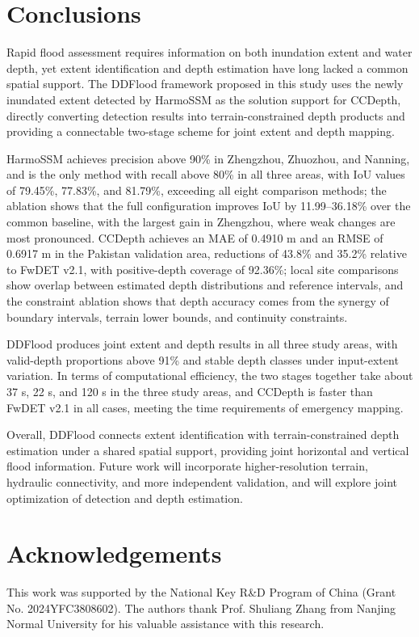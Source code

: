 \documentclass[authoryear,preprint,12pt]{elsarticle}
\begin{document}
\section{Conclusions}

Rapid flood assessment requires information on both inundation extent and water depth, yet extent identification and depth estimation have long lacked a common spatial support. The DDFlood framework proposed in this study uses the newly inundated extent detected by HarmoSSM as the solution support for CCDepth, directly converting detection results into terrain-constrained depth products and providing a connectable two-stage scheme for joint extent and depth mapping.

HarmoSSM achieves precision above 90\% in Zhengzhou, Zhuozhou, and Nanning, and is the only method with recall above 80\% in all three areas, with IoU values of 79.45\%, 77.83\%, and 81.79\%, exceeding all eight comparison methods; the ablation shows that the full configuration improves IoU by 11.99–36.18\% over the common baseline, with the largest gain in Zhengzhou, where weak changes are most pronounced. CCDepth achieves an MAE of 0.4910 m and an RMSE of 0.6917 m in the Pakistan validation area, reductions of 43.8\% and 35.2\% relative to FwDET v2.1, with positive-depth coverage of 92.36\%; local site comparisons show overlap between estimated depth distributions and reference intervals, and the constraint ablation shows that depth accuracy comes from the synergy of boundary intervals, terrain lower bounds, and continuity constraints.

DDFlood produces joint extent and depth results in all three study areas, with valid-depth proportions above 91\% and stable depth classes under input-extent variation. In terms of computational efficiency, the two stages together take about 37 s, 22 s, and 120 s in the three study areas, and CCDepth is faster than FwDET v2.1 in all cases, meeting the time requirements of emergency mapping.

Overall, DDFlood connects extent identification with terrain-constrained depth estimation under a shared spatial support, providing joint horizontal and vertical flood information. Future work will incorporate higher-resolution terrain, hydraulic connectivity, and more independent validation, and will explore joint optimization of detection and depth estimation.

\section*{Acknowledgements}

\begin{sloppypar}
This work was supported by the National Key R\&D Program of China (Grant No. 2024YFC3808602). The authors thank Prof. Shuliang Zhang from Nanjing Normal University for his valuable assistance with this research.
\end{sloppypar}

\nocite{yu2024urbanFloodThreshold}


\end{document}
